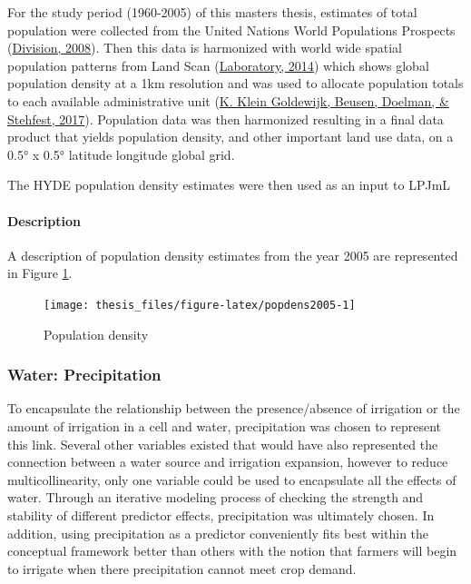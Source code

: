\documentclass[12pt,twoside]{reedthesis}
\begin{document}
For the study period (1960-2005) of this masters thesis, estimates of total population were collected from the United Nations World Populations Prospects (\protect\hyperlink{ref-unitednationspopulationdivisionWorldPopulationProspects2008}{Division, 2008}). Then this data is harmonized with world wide spatial population patterns from Land Scan (\protect\hyperlink{ref-oakridgenationallaboratoryLandScanLandscanGlobal2014}{Laboratory, 2014}) which shows global population density at a 1km resolution and was used to allocate population totals to each available administrative unit (\protect\hyperlink{ref-kleingoldewijkAnthropogenicLandUse2017}{K. Klein Goldewijk, Beusen, Doelman, \& Stehfest, 2017}). Population data was then harmonized resulting in a final data product that yields population density, and other important land use data, on a 0.5° x 0.5° latitude longitude global grid.

The HYDE population density estimates were then used as an input to LPJmL

\hypertarget{popdensdesc}{%
\paragraph{Description}\label{popdensdesc}}

A description of population density estimates from the year 2005 are represented in Figure \ref{fig:popdens2005}.
\begin{figure}

{\centering \texttt{[image: thesis\_files/figure-latex/popdens2005-1]} 

}

\caption{Population density }\label{fig:popdens2005}
\end{figure}
\hypertarget{precip}{%
\subsubsection{Water: Precipitation}\label{precip}}

To encapsulate the relationship between the presence/absence of irrigation or the amount of irrigation in a cell and water, precipitation was chosen to represent this link. Several other variables existed that would have also represented the connection between a water source and irrigation expansion, however to reduce multicollinearity, only one variable could be used to encapsulate all the effects of water. Through an iterative modeling process of checking the strength and stability of different predictor effects, precipitation was ultimately chosen. In addition, using precipitation as a predictor conveniently fits best within the conceptual framework better than others with the notion that farmers will begin to irrigate when there precipitation cannot meet crop demand.
\end{document}
